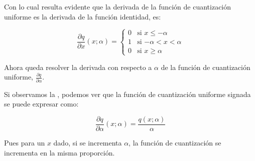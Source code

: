
Con lo cual resulta evidente que la derivada de la función de cuantización uniforme es la derivada de la función identidad, es:

\begin{equation}
    \label{eq:uniform_quantizer_ste_signed_derivative}
    \frac{\partial q}{\partial x}\left(x; \alpha\right) =
    \begin{cases}
        0 & \text{si $x \leq -\alpha$} \\
        1 & \text{si $-\alpha < x < \alpha$} \\
        0 & \text{si $x \geq \alpha$}
    \end{cases}
\end{equation}

Ahora queda resolver la derivada con respecto a $\alpha$ de la función de cuantización uniforme, $\frac{\partial q}{\partial \alpha}$.

Si observamos la , podemos ver que la función de cuantización uniforme signada se puede expresar como:

\begin{equation}
    \label{eq:uniform_quantizer_signed_dq_dalpha}
    \frac{\partial q}{\partial \alpha}\left(x; \alpha\right) = \frac{q(x; \alpha)}{\alpha}
\end{equation}

Pues para un $x$ dado, si se incrementa $\alpha$, la función de cuantización se incrementa en la misma proporción.
